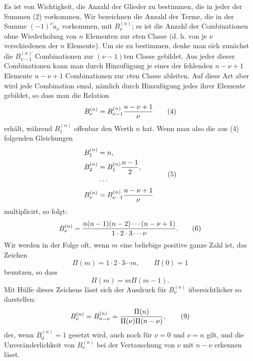\documentclass[11pt]{article}
\begin{document}
Es ist von Wichtigkeit, die Anzahl der Glieder zu bestimmen, die in jeder der Summen (2) vorkommen. Wir bezeichnen die Anzahl der Terme, die in der Summe $(-1)^\nu a_\nu$ vorkommen, mit $B_\nu^{(n)}$; es ist die Anzahl der Combinationen ohne Wiederholung von $n$ Elementen zur $\nu$ten Classe (d. h. von je $\nu$ verschiedenen der $n$ Elemente). Um sie zu bestimmen, denke man sich zunächst die $B_{\nu-1}^{(n)}$ Combinationen zur $(\nu-1)$ten Classe gebildet. Aus jeder dieser Combinationen kann man durch Hinzufügung je eines der fehlenden $n-\nu+1$ Elemente $n-\nu+1$ Combinationen zur $\nu$ten Classe ableiten. Auf diese Art aber wird jede Combination $\nu$mal, nämlich durch Hinzufügung jedes ihrer Elemente gebildet, so dass man die Relation
\begin{equation}
 B_\nu^{(n)}=B_{\nu-1}^{(n)}{n-\nu+1\over \nu}
\tag{4}
\end{equation}
erhält, während $B_1^{(n)}$ offenbar den Werth $n$ hat. Wenn man also die aus (4) folgenden Gleichungen
\begin{equation}
\begin{aligned}
 B_1^{(n)}&=n,\\
 B_2^{(n)}&=B_1^{(n)}{n-1\over 2},\\
&\cdots\\
 B_\nu^{(n)}&=B_{\nu-1}^{(n)}{n-\nu+1\over \nu}
\end{aligned}
\tag{5}
\end{equation}
multiplicirt, so folgt:
\begin{equation}
 B_\nu^{(n)}={n(n-1)(n-2)\cdots(n-\nu+1)\over 1\cdot 2\cdot 3\cdots \nu}.
\tag{6}
\end{equation}
Wir werden in der Folge oft, wenn $m$ eine beliebige positive ganze Zahl ist, das Zeichen
\begin{equation}
 \Pi(m)=1\cdot 2\cdot 3\cdots m,
 \qquad
 \Pi(0)=1
\tag{7}
\end{equation}
benutzen, so dass
\begin{equation}
 \Pi(m)=m\Pi(m-1).
\tag{8}
\end{equation}
Mit Hülfe dieses Zeichens lässt sich der Ausdruck für $B_\nu^{(n)}$ übersichtlicher so darstellen:
\begin{equation}
 B_\nu^{(n)}=B_{n-\nu}^{(n)}={\Pi(n)\over \Pi(\nu)\Pi(n-\nu)},
\tag{9}
\end{equation}
der, wenn $B_0^{(n)}=1$ gesetzt wird, auch noch für $\nu=0$ und $\nu=n$ gilt, und die Unveränderlichkeit von $B_\nu^{(n)}$ bei der Vertauschung von $\nu$ mit $n-\nu$ erkennen lässt.
\end{document}
